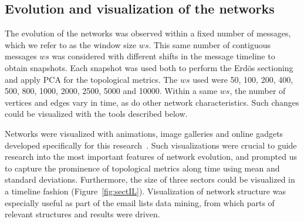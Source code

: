 \documentclass[%
 aip,
 jmp,%
 amsmath,amssymb,
 reprint,%
]{revtex4-1}
\begin{document}
\subsection{Evolution and visualization of the networks}\label{sec:viz}
   The evolution of the networks was observed within a fixed number of messages, which we refer to as the window size $ws$. This same number of contiguous messages $ws$ was considered with different shifts in the message timeline to obtain snapshots. Each snapshot was used both to perform the Erd\"os sectioning and apply PCA for the topological metrics.  
The $ws$ used were 50, 100, 200, 400, 500, 800, 1000, 2000, 2500, 5000 and 10000. Within a same $ws$, the number of vertices and edges vary in time, as do other network characteristics. Such changes could be visualized with the tools described below. 

Networks were visualized with animations, image galleries and online gadgets developed specifically for this research~\cite{animacoes,galGMANE,appGMANE}. Such visualizations were crucial to guide research into the most important features of network evolution, and prompted us to capture the prominence of topological metrics along time using mean and standard deviations. Furthermore, the size of three sectors could be visualized in a timeline fashion (Figure~\ref{fig:sectIL}). Visualization of network structure was especially useful as part of the email lists data mining, from which parts of relevant structures and results were driven.

\end{document}
